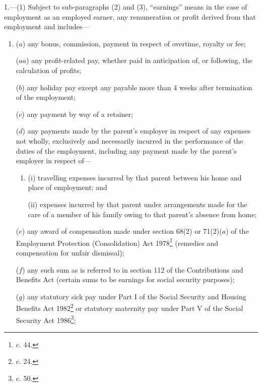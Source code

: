 \documentclass[12pt,a4paper]{article}
\begin{document}
1.—(1) Subject to sub-paragraphs (2) and (3), “earnings” means in the case of employment as an employed earner, any remuneration or profit derived from that employment and includes—
\begin{enumerate}\item[]
($a$) any bonus, commission, 
payment in respect of overtime,  %
royalty or fee;

($aa$) any profit-related pay, whether paid in anticipation of, or following, the calculation of profits;

($b$) any holiday pay except any payable more than 4 weeks after termination of the employment;

($c$) any payment by way of a retainer;


($d$) any payments made by the parent’s employer in respect of any expenses not wholly, exclusively and necessarily incurred in the performance of the duties of the employment, including any payment made by the parent’s employer in respect of—
\begin{enumerate}\item[]
(i) travelling expenses incurred by that parent between his home and place of employment; and

(ii) expenses incurred by that parent under arrangements made for the care of a member of his family owing to that parent’s absence from home;
\end{enumerate}

($e$) any award of compensation made under section 68(2) or 71(2)($a$) of the Employment Protection (Consolidation) Act 1978\footnote{ c. 44.} (remedies and compensation for unfair dismissal);

($f$) any such sum as is referred to in section 112 of the Contributions and Benefits Act (certain sums to be earnings for social security purposes);

($g$) any statutory sick pay under Part I of the Social Security and Housing Benefits Act 1982\footnote{ c. 24.} or statutory maternity pay under Part V of the Social Security Act 1986\footnote{ c. 50.};


\end{enumerate}
\end{document}
